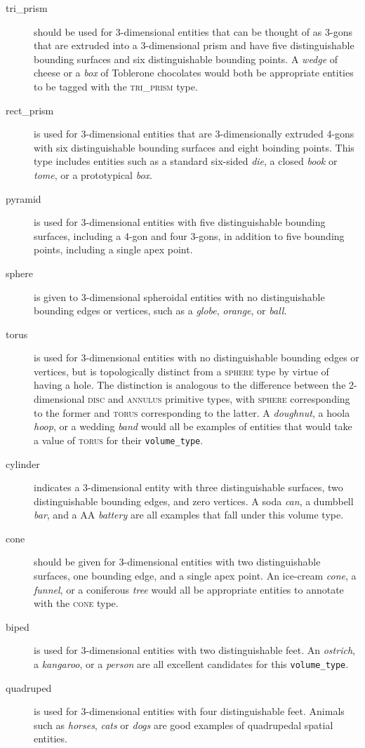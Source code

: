 \documentclass[11pt]{article}
\begin{document}
\begin{description}
    \item[{\sc tri\_prism}] should be used for 3-dimensional entities that can be thought of as 3-gons that are extruded into a 3-dimensional prism and have five distinguishable bounding surfaces and six distinguishable bounding points. A \emph{wedge} of cheese or a \emph{box} of Toblerone chocolates would both be appropriate entities to be tagged with the \textsc{tri\_prism} type.
    \item[{\sc rect\_prism}] is used for 3-dimensional entities that are 3-dimensionally extruded 4-gons with six distinguishable bounding surfaces and eight boinding points. This type includes entities such as a standard six-sided \emph{die}, a closed \emph{book} or \emph{tome}, or a prototypical \emph{box}.
    \item[{\sc pyramid}] is used for 3-dimensional entities with five distinguishable bounding surfaces, including a 4-gon and four 3-gons, in addition to five bounding points, including a single apex point.
    \item[{\sc sphere}] is given to 3-dimensional spheroidal entities with no distinguishable bounding edges or vertices, such as a \emph{globe}, \emph{orange}, or \emph{ball}.
    \item[{\sc torus}] is used for 3-dimensional entities with no distinguishable bounding edges or vertices, but is topologically distinct from a \textsc{sphere} type by virtue of having a hole. The distinction is analogous to the difference between the 2-dimensional \textsc{disc} and \textsc{annulus} primitive types, with \textsc{sphere} corresponding to the former and \textsc{torus} corresponding to the latter. A \emph{doughnut}, a hoola \emph{hoop}, or a wedding \emph{band} would all be examples of entities that would take a value of \textsc{torus} for their \texttt{volume\_type}.
    \item[{\sc cylinder}] indicates a 3-dimensional entity with three distinguishable surfaces, two distinguishable bounding edges, and zero vertices. A soda \emph{can}, a dumbbell \emph{bar}, and a AA \emph{battery} are all examples that fall under this volume type.
    \item[{\sc cone}] should be given for 3-dimensional entities with two distinguishable surfaces, one bounding edge, and a single apex point. An ice-cream \emph{cone}, a \emph{funnel}, or a coniferous \emph{tree} would all be appropriate entities to annotate with the \textsc{cone} type.
    \item[{\sc biped}] is used for 3-dimensional entities with two distinguishable feet. An \emph{ostrich}, a \emph{kangaroo}, or a \emph{person} are all excellent candidates for this \texttt{volume\_type}.
    \item[{\sc quadruped}] is used for 3-dimensional entities with four distinguishable feet. Animals such as \emph{horses}, \emph{cats} or \emph{dogs} are good examples of quadrupedal spatial entities.
\end{description}
\end{document}
